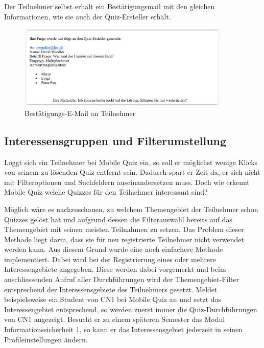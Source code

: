 Der Teilnehmer selbst erhält ein Bestätigungsmail mit den gleichen Informationen, wie sie auch der Quiz-Ersteller erhält.

\begin{figure}[H]
	\centering
	\includegraphics[width=0.9\textwidth]{Images/Feedback-Mail_Teilnehmer.PNG}
	\caption{Bestätigungs-E-Mail an Teilnehmer}
\end{figure}




\subsection{Interessensgruppen und Filterumstellung}
\label{InteressensgruppenUndFilterumstellung}
Loggt sich ein Teilnehmer bei Mobile Quiz ein, so soll er möglichst wenige Klicks von seinem zu lösenden Quiz entfernt sein. Dadurch spart er Zeit da, er sich nicht mit Filteroptionen und Suchfeldern auseinandersetzen muss. Doch wie erkennt Mobile Quiz welche Quizzes für den Teilnehmer interessant sind?

Möglich wäre es nachzuschauen, zu welchem Themengebiet der Teilnehmer schon Quizzes gelöst hat und aufgrund dessen die Filterauswahl bereits auf das Themengebiet mit seinen meisten Teilnahmen zu setzen. Das Problem dieser Methode liegt darin, dass sie für neu registrierte Teilnehmer nicht verwendet werden kann.
Aus diesem Grund wurde eine noch einfachere Methode implementiert. Dabei wird bei der Registrierung eines oder mehrere Interessengebiete angegeben. Diese werden dabei vorgemerkt und beim anschliessenden Aufruf aller Durchführungen wird der Themengebiet-Filter entsprechend der Interessensgebiete des Teilnehmers gesetzt. Meldet beispielsweise ein Student von CN1 bei Mobile Quiz an und setzt das Interessengebiet entsprechend, so werden zuerst immer die Quiz-Durchführungen von CN1 angezeigt. Besucht er zu einem späteren Semester das Modul Informationssicherheit 1, so kann er das Interessensgebiet jederzeit in seinen Profileinstellungen ändern.

